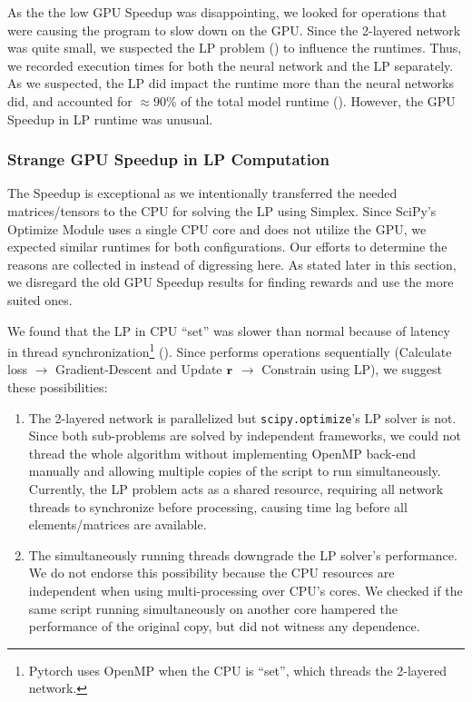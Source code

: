 As the the low GPU Speedup was disappointing, we looked for operations that were causing the program to slow down on the GPU. Since the 2-layered network was quite small, we suspected the LP problem () to influence the runtimes. Thus, we recorded execution times for both the neural network and the LP separately. As we suspected, the LP did impact the runtime more than the neural networks did, and accounted for $\approx 90 \%$ of the total model runtime (). However, the GPU Speedup in LP runtime was unusual.

\subsubsection{Strange GPU Speedup in LP Computation}
The Speedup is exceptional as we intentionally transferred the needed matrices/tensors to the CPU for solving the LP using Simplex. Since SciPy's Optimize Module uses a single CPU core and does not utilize the GPU, we expected similar runtimes for both configurations. Our efforts to determine the reasons are collected in  instead of digressing here. As stated later in this section, we disregard the old GPU Speedup results for finding rewards and use the more suited ones.

We found that the LP in CPU ``set'' was slower than normal because of latency in thread synchronization\footnote{Pytorch uses OpenMP \cite{PTDocs,OpenMP} when the CPU is ``set'', which threads the 2-layered network.} (). Since  performs operations sequentially (Calculate loss $\rightarrow$ Gradient-Descent and Update $\mathbf{r}$ $\rightarrow$ Constrain using LP), we suggest these possibilities:
\begin{enumerate}
    \item The 2-layered network is parallelized but \texttt{scipy.optimize}'s LP solver is not. Since both sub-problems are solved by independent frameworks, we could not thread the whole algorithm without implementing OpenMP \cite{OpenMP} back-end manually and allowing multiple copies of the script to run simultaneously. Currently, the LP problem acts as a shared resource, requiring all network threads to synchronize before processing, causing time lag before all elements/matrices are available.
    \item The simultaneously running threads downgrade the LP solver's performance. We do not endorse this possibility because the CPU resources are independent when using multi-processing over CPU's cores. We checked if the same script running simultaneously on another core hampered the performance of the original copy, but did not witness any dependence.
\end{enumerate}

